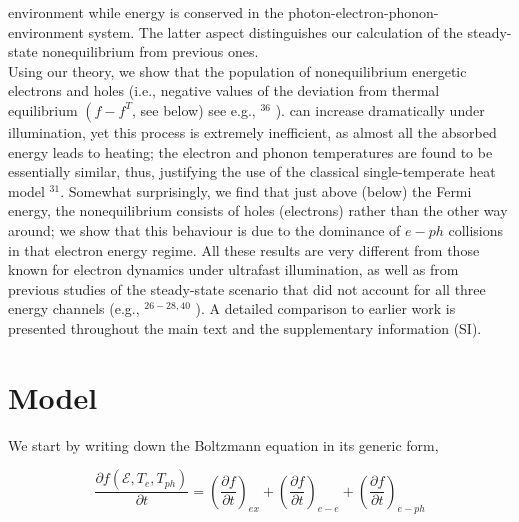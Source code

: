 \documentclass[10pt]{article}
\begin{document}
environment while energy is conserved in the photon-electron-phonon-environment system. The latter aspect distinguishes our calculation of the steady-state nonequilibrium from previous ones.\\
Using our theory, we show that the population of nonequilibrium energetic electrons and holes (i.e., negative values of the deviation from thermal equilibrium $\left(f-f^{T}\right.$, see below) see e.g., ${ }^{36}$ ). can increase dramatically under illumination, yet this process is extremely inefficient, as almost all the absorbed energy leads to heating; the electron and phonon temperatures are found to be essentially similar, thus, justifying the use of the classical single-temperate heat model ${ }^{31}$. Somewhat surprisingly, we find that just above (below) the Fermi energy, the nonequilibrium consists of holes (electrons) rather than the other way around; we show that this behaviour is due to the dominance of $e-p h$ collisions in that electron energy regime. All these results are very different from those known for electron dynamics under ultrafast illumination, as well as from previous studies of the steady-state scenario that did not account for all three energy channels (e.g., ${ }^{26-28,40}$ ). A detailed comparison to earlier work is presented throughout the main text and the supplementary information (SI).

\section*{Model}
We start by writing down the Boltzmann equation in its generic form,


\begin{equation*}
\frac{\partial f\left(\mathcal{E}, T_{e}, T_{p h}\right)}{\partial t}=\left(\frac{\partial f}{\partial t}\right)_{e x}+\left(\frac{\partial f}{\partial t}\right)_{e-e}+\left(\frac{\partial f}{\partial t}\right)_{e-p h} \tag{1}
\end{equation*}
\end{document}
